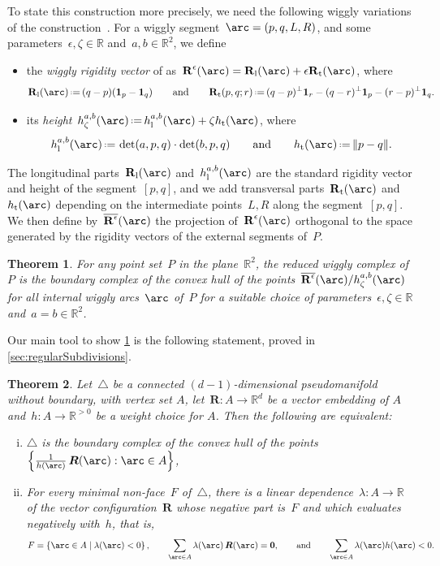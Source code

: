 \documentclass{amsart}
\newtheorem{theorem}{Theorem}%
\theoremstyle{definition}
\newcommand{\R}{\mathbb{R}} %
\renewcommand{\b}[1]{{\boldsymbol{#1}}} %
\newcommand{\set}[2]{\left\{ #1 \;\middle|\; #2 \right\}} %
\newcommand{\one}{\mathbf{1}} %
\newcommand{\eqdef}{\mbox{\,\raisebox{0.2ex}{\scriptsize\ensuremath{\mathrm:}}\ensuremath{=}\,}} %
\newcommand{\simplex}{\b{\triangle}} %
\newcommand{\darkblue}{\color{darkblue}} %
\newcommand{\defn}[1]{\textsl{\darkblue #1}} %
\newcommand{\Rvector}{\b{\rm R}} %
\newcommand{\lon}{\operatorname{l}} %
\newcommand{\trans}{\operatorname{t}} %
\newcommand{\Rlong}{\Rvector_{\lon}} %
\newcommand{\Rtrans}{\Rvector_{\trans}} %
\newcommand{\Reps}{\Rvector^\epsilon} %
\newcommand{\Rbareps}{\overline{\b{\rm R}^\epsilon}} %
\newcommand{\hlong}{h_{\lon}^{a,b}} %
\newcommand{\htrans}{h_{\trans}} %
\newcommand{\hzeta}{h_\zeta^{a,b}} %
\begin{document}
To state this construction more precisely, we need the following wiggly variations of the construction~\cite{RoteSantosStreinu-polytope}.
For a wiggly segment~$\arc = (p,q,L,R)$, and some parameters~$\epsilon, \zeta \in \R$ and~$a,b \in \R^2$, we define 
\begin{itemize}
\item the \defn{wiggly rigidity vector} of  as~$\Reps(\arc) = \Rlong(\arc) + \epsilon \Rtrans(\arc)$, where
\[
\Rlong(\arc) \eqdef (q-p) (\one_p  - \one_q)
\qquad\text{and}\qquad
\Rtrans(p,q;r) \eqdef (q-p)^\perp \one_r - (q-r)^\perp  \one_p - (r-p)^\perp  \one_q.
\]
\item its \defn{height}~$\hzeta(\arc) \eqdef \hlong(\arc) + \zeta\htrans(\arc)$, where
\[
\hlong(\arc) \eqdef \det(a,p,q) \cdot \det(b,p,q)
\qquad\text{and}\qquad
\htrans(\arc) \eqdef \|p-q\|.
\]
\end{itemize}
The longitudinal parts~$\Rlong(\arc)$ and~$\hlong(\arc)$ are the standard rigidity vector and height of the segment~$[p,q]$, and we add transversal parts~$\Rtrans(\arc)$ and~$\htrans(\arc)$ depending on the intermediate points~$L,R$ along the segment~$[p,q]$.
We then define by~$\Rbareps(\arc)$ the projection of~$\Reps(\arc)$ orthogonal to the space generated by the rigidity vectors of the external segments of~$P$.

\begin{theorem}
\label{thm:main}
For any point set~$P$ in the plane~$\R^2$, the reduced wiggly complex of~$P$ is the boundary complex of the convex hull of the points~$\Rbareps(\arc)/\hzeta(\arc)$ for all internal wiggly arcs~$\arc$ of~$P$ for a suitable choice of parameters~$\epsilon, \zeta \in \R$ and~$a = b \in \R^2$.
\end{theorem}

Our main tool to show \cref{thm:main} is the following statement, proved in \cref{sec:regularSubdivisions}.

\begin{theorem}
\label{thm:regularLiftingVersion}
Let~$\simplex$ be a connected $(d-1)$-dimensional pseudomanifold without boundary, with vertex set $A$,
let~$\b{R} : A \to \R^d$ be a vector embedding of $A$ and~$h : A \to \R^{>0}$ be a \defn{weight choice} for $A$.
Then the following are equivalent:
\begin{enumerate}[(i)]
  \item $\simplex$ is the boundary complex of the convex hull of the points~$\left\{\tfrac1{h(\arc)} \, \b{R}(\arc) : \arc \in A\right\}$,
  \item For every minimal non-face~$F$ of~$\simplex$, there is a linear dependence~$\lambda: A \to \R$ of the vector
  configuration~$\b{R}$ whose negative part is~$F$ and which evaluates negatively with~$h$, that is,
  \[
    F = \set{\arc \in A}{\lambda(\arc) < 0},
    \qquad
    \sum_{\arc \in A} \lambda(\arc) \, \b{R}(\arc) = \b{0},
    \qquad\text{and}\qquad
    \sum_{\arc \in A} {\lambda(\arc)}{h(\arc)} < 0.
  \]
\end{enumerate}
\end{theorem}
\end{document}
